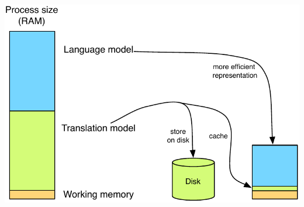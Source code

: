 \documentclass[landscape]{uedslides2C}
\begin{document}

\begin{center} 
\includegraphics[scale=1.4]{less-memory.pdf}
\end{center}

\end{document}
